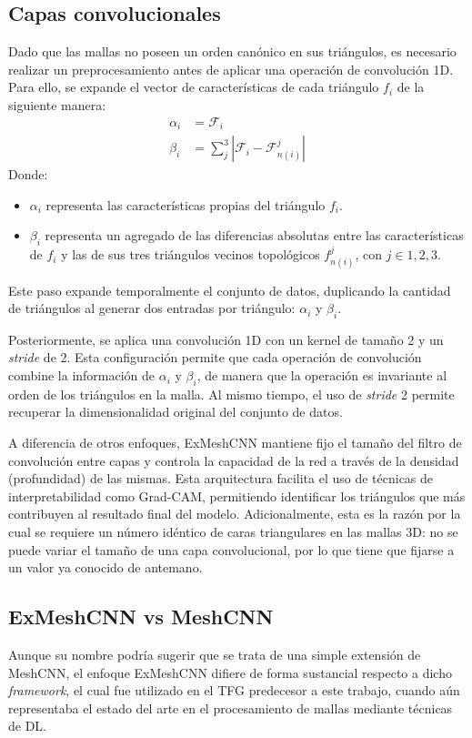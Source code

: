 \subsection{Capas convolucionales}
Dado que las mallas no poseen un orden canónico en sus triángulos, es necesario realizar un preprocesamiento antes de aplicar una operación de convolución 1D. Para ello, se expande el vector de características de cada triángulo $f_i$ de la siguiente manera:
\begin{align}
    \alpha_i &= \mathcal{F}_{i} \\
    \beta_i &= \sum_{j}^{3} | \mathcal{F}_{i} - \mathcal{F}_{n(i)}^{j}| 
\end{align}
Donde:
\begin{itemize}
    \item $\alpha_i$ representa las características propias del triángulo $f_i$.
    \item $\beta_i$ representa un agregado de las diferencias absolutas entre las características de $f_i$ y las de sus tres triángulos vecinos topológicos $f_{n(i)}^{j}$, con $j \in {1, 2, 3}$.
\end{itemize}

Este paso expande temporalmente el conjunto de datos, duplicando la cantidad de triángulos al generar dos entradas por triángulo: $\alpha_i$ y $\beta_i$.

Posteriormente, se aplica una convolución 1D con un kernel de tamaño 2 y un \textit{stride} de 2. Esta configuración permite que cada operación de convolución combine la información de $\alpha_i$ y $\beta_i$, de manera que la operación es invariante al orden de los triángulos en la malla. Al mismo tiempo, el uso de \textit{stride} 2 permite recuperar la dimensionalidad original del conjunto de datos.

A diferencia de otros enfoques, ExMeshCNN mantiene fijo el tamaño del filtro de convolución entre capas y controla la capacidad de la red a través de la densidad (profundidad) de las mismas. Esta arquitectura facilita el uso de técnicas de interpretabilidad como Grad-CAM, permitiendo identificar los triángulos que más contribuyen al resultado final del modelo. Adicionalmente, esta es la razón por la cual se requiere un número idéntico de caras triangulares en las mallas 3D: no se puede variar el tamaño de una capa convolucional, por lo que tiene que fijarse a un valor ya conocido de antemano.

\subsection{ExMeshCNN vs MeshCNN}
Aunque su nombre podría sugerir que se trata de una simple extensión de MeshCNN, el enfoque ExMeshCNN difiere de forma sustancial respecto a dicho \textit{framework}, el cual fue utilizado en el TFG predecesor a este trabajo, cuando aún representaba el estado del arte en el procesamiento de mallas mediante técnicas de DL.

